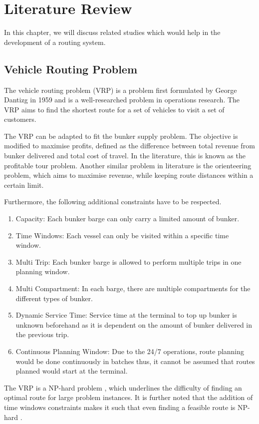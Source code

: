 \chapter{Literature Review}
In this chapter, we will discuss related studies which would help in the development of a routing system.

\section{Vehicle Routing Problem}
The vehicle routing problem (VRP) is a problem first formulated by George Dantizg in 1959 \cite{dantzig_truck_1959} and is a well-researched problem in operations research. The VRP aims to find the shortest route for a set of vehicles to visit a set of customers. 

The VRP can be adapted to fit the bunker supply problem. The objective is modified to maximise profits, defined as the difference between total revenue from bunker delivered and total cost of travel. In the literature, this is known as the profitable tour problem. Another similar problem in literature is the orienteering problem, which aims to maximise revenue, while keeping route distances within a certain limit.

Furthermore, the following additional constraints have to be respected.  
\begin{enumerate}
\item Capacity: Each bunker barge can only carry a limited amount of bunker.
\item Time Windows: Each vessel can only be visited within a specific time window.
\item Multi Trip: Each bunker barge is allowed to perform multiple trips in one planning window.
\item Multi Compartment: In each barge, there are multiple compartments for the different types of bunker.
\item Dynamic Service Time: Service time at the terminal to top up bunker is unknown beforehand as it is dependent on the amount of bunker delivered in the previous trip.
\item Continuous Planning Window: Due to the 24/7 operations, route planning would be done continuously in batches thus, it cannot be assumed that routes planned would start at the terminal.
\end{enumerate}

The VRP is a NP-hard problem \cite{lenstra_complexity_1981}, which underlines the difficulty of finding an optimal route for large problem instances. It is further noted that the addition of time windows constraints makes it such that even finding a feasible route is  NP-hard \cite{savelsbergh_local_1985}.

